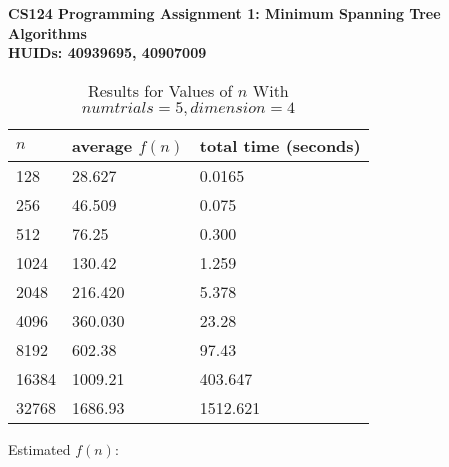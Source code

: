 \documentclass[11pt]{article}
\begin{document}
\textbf{CS124 Programming Assignment 1: Minimum Spanning Tree Algorithms\\
	HUIDs: 40939695, 40907009}
	\begin{table}[h]
		\centering
		\caption{Results for Values of $n$ With $numtrials = 5, dimension = 4$}
		\begin{tabular}{lll}
			$n$                         & average $f(n)$                        & total time (seconds)                        \\ \hline
			\multicolumn{1}{|l|}{128} & \multicolumn{1}{l|}{28.627} & \multicolumn{1}{l|}{0.0165} \\ \hline
			\multicolumn{1}{|l|}{256}    & \multicolumn{1}{l|}{46.509}       & \multicolumn{1}{l|}{0.075}       \\ \hline
			\multicolumn{1}{|l|}{512}    & \multicolumn{1}{l|}{76.25}       & \multicolumn{1}{l|}{0.300}       \\ \hline
			\multicolumn{1}{|l|}{1024}    & \multicolumn{1}{l|}{130.42}       & \multicolumn{1}{l|}{1.259}       \\ \hline
			\multicolumn{1}{|l|}{2048}    & \multicolumn{1}{l|}{216.420}       & \multicolumn{1}{l|}{5.378}       \\ \hline
			\multicolumn{1}{|l|}{4096}    & \multicolumn{1}{l|}{360.030}       & \multicolumn{1}{l|}{23.28}       \\ \hline
			\multicolumn{1}{|l|}{8192}    & \multicolumn{1}{l|}{602.38}       & \multicolumn{1}{l|}{97.43}       \\ \hline
			\multicolumn{1}{|l|}{16384}    & \multicolumn{1}{l|}{1009.21}       & \multicolumn{1}{l|}{403.647}       \\ \hline
			\multicolumn{1}{|l|}{32768}    & \multicolumn{1}{l|}{1686.93}       & \multicolumn{1}{l|}{1512.621}       \\ \hline
		\end{tabular}
	\end{table}
	Estimated $f(n)$: 
	
\end{document}
